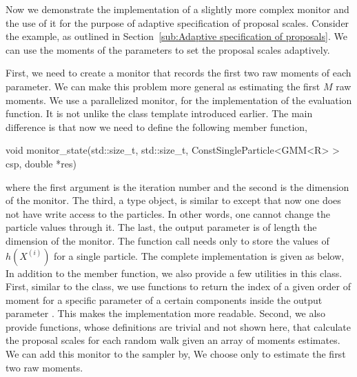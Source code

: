 Now we demonstrate the implementation of a slightly more complex monitor and the use of it for the purpose of adaptive specification of proposal scales. Consider the \gmm example, as outlined in Section~\ref{sub:Adaptive specification of proposals}. We can use the moments of the parameters to set the proposal scales adaptively.

First, we need to create a monitor that records the first two raw moments of each parameter. We can make this problem more general as estimating the first $M$ raw moments. We use a parallelized monitor,  for the implementation of the evaluation function. It is not unlike the  class template introduced earlier. The main difference is that now we need to define the following member function,
\begin{cppcode}
void monitor_state(std::size_t, std::size_t,
        ConstSingleParticle<GMM<R> > csp, double *res)
\end{cppcode}
where the first argument is the iteration number and the second is the dimension of the monitor. The third, a  type object, is similar to  except that now one does not have write access to the particles. In other words, one cannot change the particle values through it. The last, the output parameter  is of length the dimension of the monitor. The function call needs only to store the values of $h(X^{(i)})$ for a single particle. The complete implementation is given as below,
In addition to the  member function, we also provide a few utilities in this class. First, similar to the  class, we use functions to return the index of a given order of moment for a specific parameter of a certain components inside the output parameter . This makes the implementation more readable. Second, we also provide functions, whose definitions are trivial and not shown here, that calculate the proposal scales for each random walk given an array of moments estimates. We can add this monitor to the sampler by,
We choose only to estimate the first two raw moments.

